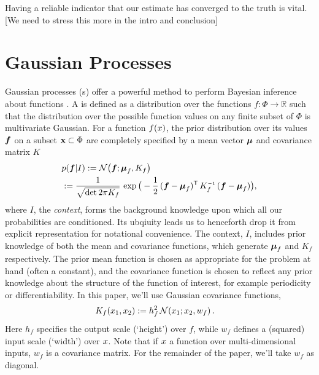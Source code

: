 \documentclass{article}
\begin{document}
Having a reliable indicator that our estimate has converged to the truth is vital. [We need to stress this more in the intro and conclusion]

\section{Gaussian Processes}
Gaussian processes (\gp s) offer a powerful method to perform Bayesian inference about functions \citep{GPsBook}. A \gpb is defined as a distribution over the functions $f: \Phi \rightarrow \mathbb{R}$ such that the distribution over the possible function values on any finite subset of $\Phi$ is multivariate Gaussian.  For a function $f(\lfv)$, the prior distribution over its values $\vf$ on a subset $\vlfv \subset \Phi$ are completely specified by a mean vector $\vmu$ and covariance matrix $K$
\begin{align*}%
\textstyle
 &\p{\vf}{I} \deq \N{\vf}{\vmu_{f}}{K_{f}}\\
 &\deq\frac{1}{\sqrt{\det{2\pi K_{f}}}}\,\exp \big(-\frac{1}{2}\,(\vf-\vmu_{f})\tra\,K_{f}\inv\,(\vf-\vmu_{f})\big),
\end{align*}
where $I$, the \emph{context}, forms the background knowledge upon which all our probabilities are conditioned. Its ubqiuity leads us to henceforth drop it from explicit representation for notational convenience. 
The context, $I$, includes prior knowledge of both the mean and covariance functions, which generate $\vmu_{f}$ and $K_{f}$ respectively. 
The prior mean function is chosen as appropriate for the problem at hand (often a constant), and the covariance function is chosen to reflect any prior knowledge about the
structure of the function of interest, for example periodicity or differentiability. In this paper, we'll use Gaussian covariance functions,
\begin{align} \label{eq:Gaussian_cov_fn}
\textstyle
K_{f}(\lfv_1,\lfv_2)& \deq h_f^2\,\N{\lfv_1}{\lfv_2}{w_{f}}.
\end{align} 
Here $h_f$ specifies the output scale (`height') over $f$, while $w_f$ defines a (squared) input scale (`width') over $\lfv$. Note that if $\lfv$ a function over multi-dimensional inputs, $w_f$ is a covariance matrix. For the remainder of the paper, we'll take $w_f$ as diagonal. 
\end{document}
